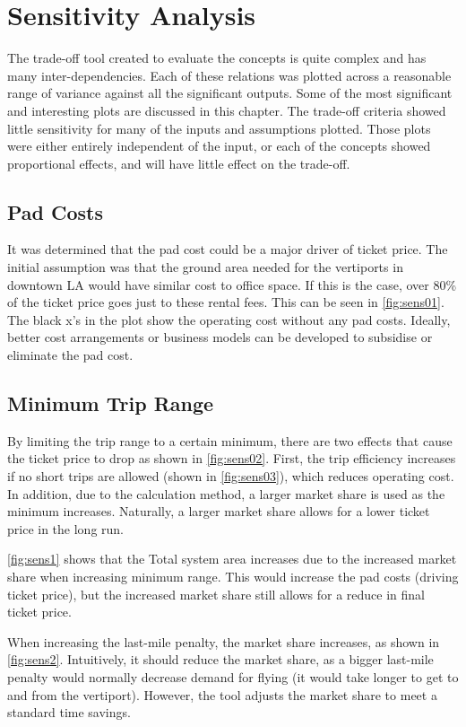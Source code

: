 \newpage
\chapter{Sensitivity Analysis} \label{ch:sensitivity}

The trade-off tool created to evaluate the concepts is quite complex and has many inter-dependencies. Each of these relations was plotted across a reasonable range of variance against all the significant outputs. Some of the most significant and interesting plots are discussed in this chapter. The trade-off criteria showed little sensitivity for many of the inputs and assumptions plotted. Those plots were either entirely independent of the input, or each of the concepts showed proportional effects, and will have little effect on the trade-off.

\section{Pad Costs}
It was determined that the pad cost could be a major driver of ticket price. The initial assumption was that the ground area needed for the vertiports in downtown LA would have similar cost to office space. If this is the case, over 80\% of the ticket price goes just to these rental fees. This can be seen in \autoref{fig:sens01}. The black x's in the plot show the operating cost without any pad costs. Ideally, better cost arrangements or business models can be developed to subsidise or eliminate the pad cost.

\section{Minimum Trip Range}
By limiting the trip range to a certain minimum, there are two effects that cause the ticket price to drop as shown in \autoref{fig:sens02}. First, the trip efficiency increases if no short trips are allowed (shown in \autoref{fig:sens03}), which reduces operating cost. In addition, due to the calculation method, a larger market share is used as the minimum increases. Naturally, a larger market share allows for a lower ticket price in the long run. 

\autoref{fig:sens1} shows that the Total system area increases due to the increased market share when increasing minimum range. This would increase the pad costs (driving ticket price), but the increased market share still allows for a reduce in final ticket price. 

When increasing the last-mile penalty, the market share increases, as shown in \autoref{fig:sens2}. Intuitively, it should reduce the market share, as a bigger last-mile penalty would normally decrease demand for flying (it would take longer to get to and from the vertiport). However, the tool adjusts the market share to meet a standard time savings.

